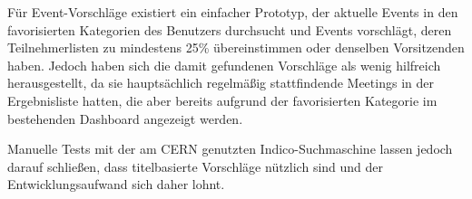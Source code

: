 Für Event-Vorschläge existiert ein einfacher Prototyp, der aktuelle Events in den favorisierten
Kategorien des Benutzers durchsucht und Events vorschlägt, deren Teilnehmerlisten zu mindestens 25\%
übereinstimmen oder denselben Vorsitzenden haben. Jedoch haben sich die damit gefundenen Vorschläge
als wenig hilfreich herausgestellt, da sie hauptsächlich regelmäßig stattfindende Meetings in der
Ergebnisliste hatten, die aber bereits aufgrund der favorisierten Kategorie im bestehenden Dashboard
angezeigt werden.

Manuelle Tests mit der am CERN genutzten Indico-Suchmaschine lassen jedoch darauf schließen, dass
titelbasierte Vorschläge nützlich sind und der Entwicklungsaufwand sich daher lohnt.

